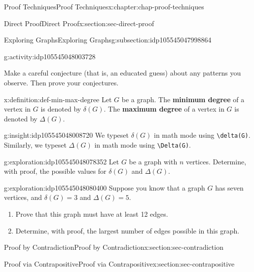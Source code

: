\documentclass[oneside,10pt,]{book}
\newcommand{\mono}[1]{\texttt{#1}}
\newcommand{\terminology}[1]{\textbf{#1}}
\begin{document}
\begin{chapterptx}{Proof Techniques}{}{Proof Techniques}{}{}{x:chapter:chap-proof-techniques}
\begin{sectionptx}{Direct Proof}{}{Direct Proof}{}{}{x:section:sec-direct-proof}
\begin{subsectionptx}{Exploring Graphs}{}{Exploring Graphs}{}{}{g:subsection:idp105545047998864}
\begin{activity}{}{g:activity:idp105545048003728}
\begin{itemize}[label=\textbullet]
\end{itemize}
Make a careful conjecture (that is, an educated guess) about any patterns you observe. Then prove your conjectures.%
\end{activity}%
\begin{definition}{}{x:definition:def-min-max-degree}%
Let \(G\) be a graph. The \terminology{minimum degree} of a vertex in \(G\) is denoted by \(\delta(G)\). The \terminology{maximum degree} of a vertex in \(G\) is denoted by \(\Delta(G)\).%
\end{definition}
\begin{insight}{}{g:insight:idp105545048008720}%
%
%
We typeset \(\delta(G)\) in math mode using \mono{\textbackslash{}delta(G)}. Similarly, we typeset \(\Delta(G)\) in math mode using \mono{\textbackslash{}Delta(G)}.%
\end{insight}
\begin{exploration}{}{g:exploration:idp105545048078352}%
Let \(G\) be a graph with \(n\) vertices. Determine, with proof, the possible values for \(\delta(G)\) and \(\Delta(G)\).%
\end{exploration}%
\begin{exploration}{}{g:exploration:idp105545048080400}%
Suppose you know that a graph \(G\) has seven vertices, and \(\delta(G) = 3\) and \(\Delta(G) = 5\).%
%
\begin{enumerate}
\item{}Prove that this graph must have at least 12 edges.%
\item{}Determine, with proof, the largest number of edges possible in this graph.%
\end{enumerate}
\end{exploration}%
\end{subsectionptx}
\end{sectionptx}
%
%
\typeout{************************************************}
\typeout{************************************************}
%
\begin{sectionptx}{Proof by Contradiction}{}{Proof by Contradiction}{}{}{x:section:sec-contradiction}
\end{sectionptx}
%
%
\typeout{************************************************}
\typeout{************************************************}
%
\begin{sectionptx}{Proof via Contrapositive}{}{Proof via Contrapositive}{}{}{x:section:sec-contrapositive}

\end{sectionptx}
\end{chapterptx}
\end{document}

